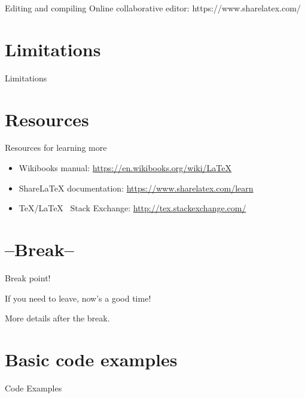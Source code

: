 \documentclass[xcolor={dvipsnames}]{beamer}
\begin{document}
\begin{frame}{Editing and compiling}
%
Online collaborative editor: https://www.sharelatex.com/
\end{frame}

\section{Limitations}
\begin{frame}{Limitations}
\end{frame}

\section{Resources}
\begin{frame}{Resources for learning more}
\begin{itemize}
\item Wikibooks manual: \url{https://en.wikibooks.org/wiki/LaTeX}
\item ShareLaTeX documentation: \url{https://www.sharelatex.com/learn}
\item \TeX/\LaTeX~ Stack Exchange: \url{http://tex.stackexchange.com/}
\end{itemize}
\end{frame}

\section{--Break--}
\begin{frame}{Break point!}
\begin{block}{}
\begin{center}
If you need to leave, now's a good time!

More details after the break.
\end{center}
\end{block}
\end{frame}

\section{Basic code examples}
\begin{frame}{Code Examples}
\end{frame}
\end{document}
